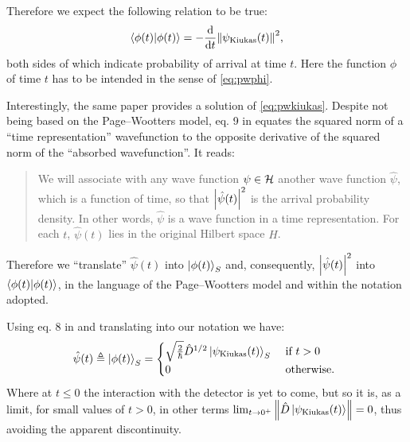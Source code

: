 Therefore we expect the following relation to be true:
\begin{equation}\label{eq:pwkiukas}
  \braket{\phi(t)} = -\dv{t}\norm{\psi_{\text{Kiukas}}(t)}^2 \text{,}
\end{equation}
both sides of which indicate probability of arrival at time $t$.
Here the function $\phi$ of time $t$ has to be intended in the sense of
\eqref{eq:pwphi}.

\citereset
Interestingly, the same paper provides a solution of \eqref{eq:pwkiukas}.
Despite not being based on the Page--Wootters model, eq. 9 in \cite{RuschhauptAbsorption}
equates the squared norm of a ``time representation'' wavefunction
to the opposite derivative of the squared norm of the ``absorbed wavefunction''.
It reads:
\begin{quote}
  We will associate with any wave function $\psi \in \mathcal{H}$
  another wave function $\hat{\psi}$,
  which is a function of time, so that
  $\abs{\hat{\psi}(t)}^2$
  is the arrival probability density. In other words,
  $\hat{\psi}$ is a wave function in a time representation. For each
  $t$, $\hat{\psi}(t)$ lies in the original Hilbert space $H$.
\end{quote}
Therefore we ``translate'' $\hat{\psi}(t)$ into $\ket{\phi(t)}_S$
and, consequently, $\abs{\hat{\psi}(t)}^2$ into $\braket{\phi(t)}$,
in the language of the Page--Wootters model and within the notation
adopted.

\citereset
Using eq. 8 in \cite{RuschhauptAbsorption} and translating into our notation we have:
\begin{equation}\label{eq:phi_psi_kiukas}
  \hat{\psi}(t) \triangleq
  \ket{\phi(t)}_S =
  \begin{cases}
    \sqrt{\frac{2}{\hbar}} \hat{D}^{1/2} \ket{\psi_{\text{Kiukas}}(t)}_S &\text{ if } t > 0 \\
    0 &\text{ otherwise. }
  \end{cases}
\end{equation}
Where at $t \le 0$ the interaction with the detector is yet to come,
but so it is, as a limit, for small values of $t>0$,
in other terms
$\lim_{t \to 0^{+}} \norm{\hat{D} \ket{\psi_{\text{Kiukas}}(t)}} = 0$, thus avoiding the apparent discontinuity.




